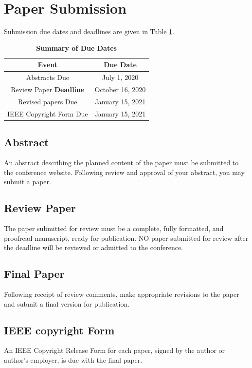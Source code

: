 \documentclass[twocolumn,letterpaper]{IEEEAerospaceCLS}  %
\begin{document}
\section{Paper Submission}
Submission due dates and deadlines are given in Table \ref{DueDates}.

\begin{table}
\renewcommand{\arraystretch}{1.3}
\caption{\bf Summary of Due Dates}
\label{DueDates}
\centering
\begin{tabular}{|c|c|}
\hline
\bfseries Event & \bfseries Due Date \\
\hline\hline
Abstracts Due               & July 1, 2020 \\
Review Paper {\bf Deadline} & October 16, 2020 \\
Revised papers Due          & January 15, 2021\\
IEEE Copyright Form Due     & January 15, 2021\\
\hline
\end{tabular}
\end{table}

\subsection{Abstract}
An abstract describing the planned content of the paper must be submitted to the conference website. Following review and approval of your abstract, you may submit a paper.

\subsection{Review Paper}
The paper submitted for review must be a complete, fully formatted, and proofread manuscript, ready for publication. NO paper submitted for review after the deadline will be reviewed or admitted to the conference.

\subsection{Final Paper}
Following receipt of review comments, make appropriate revisions to the paper and submit a final version for publication.

\subsection{IEEE copyright Form}
An IEEE Copyright Release Form for each paper, signed by the author or author's employer, is due with the final paper. 
\end{document}
